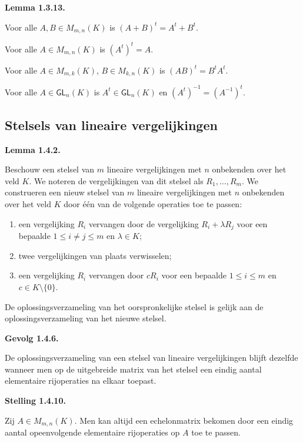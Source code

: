 \documentclass[10pt,a4paper]{article}
\newenvironment{res}[2]{%
  \par\noindent\textbf{#1 #2.}%
}{%
  \par\vspace{2pt}\normalfont
}
\begin{document}
\begin{res}{Lemma}{1.3.13}
\begin{myenum}
\item Voor alle $A,B\in M_{m,n}(K)$ is $(A+B)^t=A^t+B^t$.
\item Voor alle $A\in M_{m,n}(K)$ is $(A^t)^t=A$.
\item Voor alle $A\in M_{m,k}(K)$, $B\in M_{k,n}(K)$ is $(AB)^t=B^tA^t$.
\item Voor alle $A\in \mathsf{GL}_n(K)$ is $A^t\in \mathsf{GL}_n(K)$ en $(A^t)^{-1}=(A^{-1})^t$.
\end{myenum}
\end{res}

\subsection{Stelsels van lineaire vergelijkingen}
\begin{res}{Lemma}{1.4.2}
Beschouw een stelsel van $m$ lineaire vergelijkingen met $n$ onbekenden over het veld $K$. We noteren de vergelijkingen van dit stelsel als $R_1,\dots,R_m$. We construeren een nieuw stelsel van $m$ lineaire vergelijkingen met $n$ onbekenden over het veld $K$ door \'e\'en van de volgende operaties toe te passen:
\begin{enumerate}[label=(\arabic*),leftmargin=1.8em,itemsep=1pt,topsep=1pt]
\item een vergelijking $R_i$ vervangen door de vergelijking $R_i+\lambda R_j$ voor een bepaalde $1\le i\ne j\le m$ en $\lambda\in K$;
\item twee vergelijkingen van plaats verwisselen;
\item een vergelijking $R_i$ vervangen door $cR_i$ voor een bepaalde $1\le i\le m$ en $c\in K\setminus\{0\}$.
\end{enumerate}
De oplossingsverzameling van het oorspronkelijke stelsel is gelijk aan de oplossingsverzameling van het nieuwe stelsel.
\end{res}

\begin{res}{Gevolg}{1.4.6}
De oplossingsverzameling van een stelsel van lineaire vergelijkingen blijft dezelfde wanneer men op de uitgebreide matrix van het stelsel een eindig aantal elementaire rijoperaties na elkaar toepast.
\end{res}

\begin{res}{Stelling}{1.4.10}
Zij $A\in M_{m,n}(K)$. Men kan altijd een echelonmatrix bekomen door een eindig aantal opeenvolgende elementaire rijoperaties op $A$ toe te passen.
\end{res}
\end{document}
